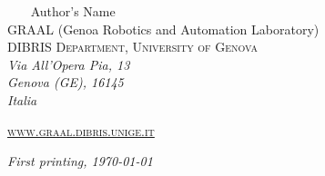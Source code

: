 \newpage

{
\pagestyle{empty}	
	
~\vfill
\thispagestyle{empty}
\setlength{\parindent}{0pt}
\setlength{\parskip}{\baselineskip}
\the\year\ \copyleft\ Author's Name\\
GRAAL (Genoa Robotics and Automation Laboratory)\\
\textsc{DIBRIS Department, University of Genova}\\[6pt]
\textit{Via All'Opera Pia, 13\\
Genova (GE), 16145\\
Italia\\}


\par\href{www.graal.dibris.unige.it}{\textsc{www.graal.dibris.unige.it}}


\par\textit{First printing, \monthyear\today}	
}

\clearpage